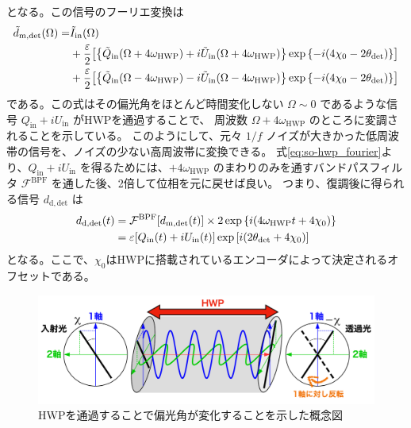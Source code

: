 \documentclass[../../main.tex]{subfiles}
\begin{document}
となる。この信号のフーリエ変換は
\begin{equation}
    \label{eq:so-hwp_fourier}
    \begin{split}
        \tilde{d}_{\mathrm{m}, \mathrm{det}}(\Omega) = &\tilde{I}_{\mathrm{in}}(\Omega) \\
            &+ \dfrac{\varepsilon}{2}\qty[\qty{\tilde{Q}_{\mathrm{in}}(\Omega+4\omega_{\mathrm{HWP}})+i\tilde{U}_{\mathrm{in}}(\Omega+4\omega_{\mathrm{HWP}})}\exp\qty{-i\qty(4\chi_0 - 2\theta_{\mathrm{det}})}] \\
            &+ \dfrac{\varepsilon}{2}\qty[\qty{\tilde{Q}_{\mathrm{in}}(\Omega-4\omega_{\mathrm{HWP}})-i\tilde{U}_{\mathrm{in}}(\Omega-4\omega_{\mathrm{HWP}})}\exp\qty{-i\qty(4\chi_0 - 2\theta_{\mathrm{det}})}]
    \end{split}
\end{equation}
である。この式はその偏光角をほとんど時間変化しない $\Omega\sim0$ であるような信号 $Q_{\mathrm{in}}+iU_{\mathrm{in}}$ がHWPを通過することで、
周波数 $\Omega + 4\omega_{\mathrm{HWP}}$ のところに変調されることを示している。
このようにして、元々 $1/f$ ノイズが大きかった低周波帯の信号を、ノイズの少ない高周波帯に変換できる。
式\eqref{eq:so-hwp_fourier}より、$Q_{\mathrm{in}}+iU_{\mathrm{in}}$ を得るためには、$+4\omega_{\mathrm{HWP}}$ のまわりのみを通すバンドパスフィルタ $\mathcal{F}^{\mathrm{BPF}}$ を通した後、2倍して位相を元に戻せば良い。
つまり、復調後に得られる信号 $d_{\mathrm{d, det}}$ は
\begin{align}
    d_{\mathrm{d, det}}(t) &= \mathcal{F}^{\mathrm{BPF}}\qty[d_{\mathrm{m,det}}(t)]\times 2\exp\qty{i\qty(4\omega_{\mathrm{HWP}}t + 4\chi_0)} \\
    &= \varepsilon\qty[Q_{\mathrm{in}}(t) + iU_{\mathrm{in}}(t)]\exp\qty[i\qty(2\theta_{\mathrm{det}}+4\chi_0)]
    \label{eq:so-hwp_demod}
\end{align}
となる。ここで、$\chi_0$はHWPに搭載されているエンコーダによって決定されるオフセットである。

\begin{figure}[H]
    \centering
    \includegraphics[width=1.0\textwidth]{simons_observatory/hwp_satoru.pdf}
    \caption{HWPを通過することで偏光角が変化することを示した概念図~\cite{takakura_PhD}}
    \label{fig:so-hwp_satoru}
\end{figure}
\end{document}
